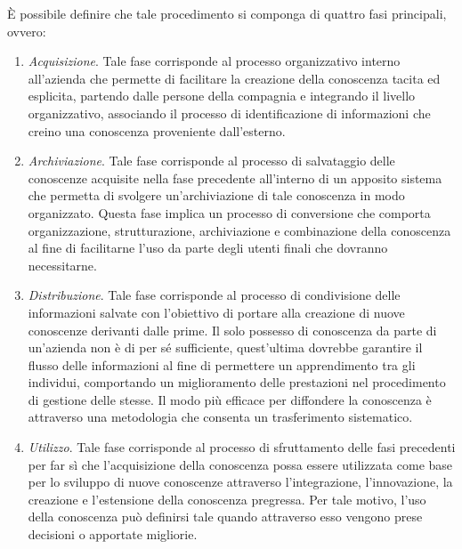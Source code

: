 È possibile definire che tale procedimento si componga di quattro fasi principali, ovvero:\cite{knowledge_management_process}
\begin{enumerate}
    \item \textit{Acquisizione}. Tale fase corrisponde al processo organizzativo interno all’azienda che permette di facilitare la creazione della conoscenza tacita ed esplicita, partendo dalle persone della compagnia e integrando il livello organizzativo, associando il processo di identificazione di informazioni che creino una conoscenza proveniente dall’esterno.
    \item \textit{Archiviazione}. Tale fase corrisponde al processo di salvataggio delle conoscenze acquisite nella fase precedente all’interno di un apposito sistema che permetta di svolgere un’archiviazione di tale conoscenza in modo organizzato. Questa fase implica un processo di conversione che comporta organizzazione, strutturazione, archiviazione e combinazione della conoscenza al fine di facilitarne l’uso da parte degli utenti finali che dovranno necessitarne.
    \item \textit{Distribuzione}. Tale fase corrisponde al processo di condivisione delle informazioni salvate con l’obiettivo di portare alla creazione di nuove conoscenze derivanti dalle prime. Il solo possesso di conoscenza da parte di un’azienda non è di per sé sufficiente, quest’ultima dovrebbe garantire il flusso delle informazioni al fine di permettere un apprendimento tra gli individui, comportando un miglioramento delle prestazioni nel procedimento di gestione delle stesse. Il modo più efficace per diffondere la conoscenza è attraverso una metodologia che consenta un trasferimento sistematico.
    \item \textit{Utilizzo}. Tale fase corrisponde al processo di sfruttamento delle fasi precedenti per far sì che l’acquisizione della conoscenza possa essere utilizzata come base per lo sviluppo di nuove conoscenze attraverso l’integrazione, l’innovazione, la creazione e l’estensione della conoscenza pregressa. Per tale motivo, l’uso della conoscenza può definirsi tale quando attraverso esso vengono prese decisioni o apportate migliorie.
\end{enumerate}

